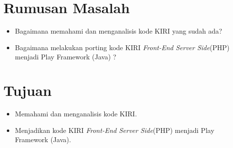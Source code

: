 %
%
%

\section{Rumusan Masalah}
\label{rumusanMasalah}
\begin{itemize}
	\item Bagaimana memahami dan menganalisis kode KIRI yang sudah ada?
	\item Bagaimana melakukan porting kode KIRI \textit{Front-End Server Side}(PHP) menjadi Play Framework (Java) ?
\end{itemize}

\section{Tujuan}
\label{sec:tujuan}
\begin{itemize}
	\item Memahami dan menganalisis kode KIRI.
	\item Menjadikan kode KIRI \textit{Front-End Server Side}(PHP) menjadi Play Framework (Java).
\end{itemize}

